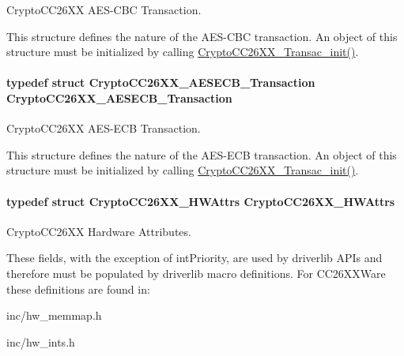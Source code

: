 Crypto\+C\+C26\+X\+X A\+E\+S-\/\+C\+B\+C Transaction. 

This structure defines the nature of the A\+E\+S-\/\+C\+B\+C transaction. An object of this structure must be initialized by calling \hyperlink{_crypto_c_c26_x_x_8h_afb3ea8faceda234cdd62c5f53e203946}{Crypto\+C\+C26\+X\+X\+\_\+\+Transac\+\_\+init()}. 
\paragraph[{Crypto\+C\+C26\+X\+X\+\_\+\+A\+E\+S\+E\+C\+B\+\_\+\+Transaction}]{\setlength{\rightskip}{0pt plus 5cm}typedef struct {\bf Crypto\+C\+C26\+X\+X\+\_\+\+A\+E\+S\+E\+C\+B\+\_\+\+Transaction}  {\bf Crypto\+C\+C26\+X\+X\+\_\+\+A\+E\+S\+E\+C\+B\+\_\+\+Transaction}}\label{_crypto_c_c26_x_x_8h_a49f5f56e3a3f2f1aa354067e4261533f}


Crypto\+C\+C26\+X\+X A\+E\+S-\/\+E\+C\+B Transaction. 

This structure defines the nature of the A\+E\+S-\/\+E\+C\+B transaction. An object of this structure must be initialized by calling \hyperlink{_crypto_c_c26_x_x_8h_afb3ea8faceda234cdd62c5f53e203946}{Crypto\+C\+C26\+X\+X\+\_\+\+Transac\+\_\+init()}. 
\paragraph[{Crypto\+C\+C26\+X\+X\+\_\+\+H\+W\+Attrs}]{\setlength{\rightskip}{0pt plus 5cm}typedef struct {\bf Crypto\+C\+C26\+X\+X\+\_\+\+H\+W\+Attrs}  {\bf Crypto\+C\+C26\+X\+X\+\_\+\+H\+W\+Attrs}}\label{_crypto_c_c26_x_x_8h_a43b8004f918cfc847b65ebe981970da7}


Crypto\+C\+C26\+X\+X Hardware Attributes. 

These fields, with the exception of int\+Priority, are used by driverlib A\+P\+Is and therefore must be populated by driverlib macro definitions. For C\+C26\+X\+X\+Ware these definitions are found in\+:
\begin{DoxyItemize}
\item inc/hw\+\_\+memmap.\+h
\item inc/hw\+\_\+ints.\+h
\end{DoxyItemize}

